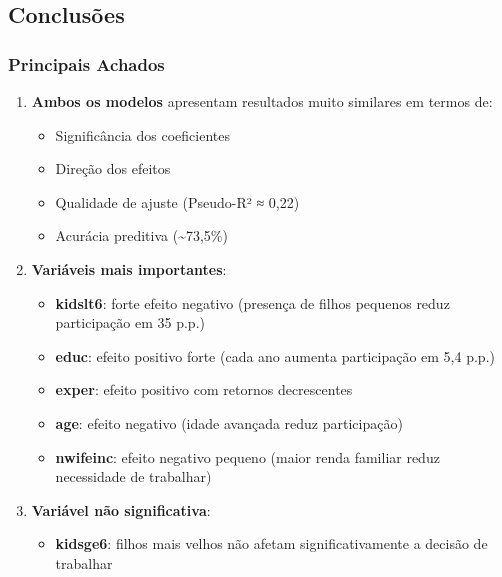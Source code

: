 \documentclass[
  letterpaper,
  DIV=11,
  numbers=noendperiod]{scrartcl}
\providecommand{\tightlist}{%
  \setlength{\itemsep}{0pt}\setlength{\parskip}{0pt}}\usepackage{longtable,booktabs,array}
\begin{document}
\subsection{Conclusões}\label{conclusuxf5es}

\subsubsection{Principais Achados}\label{principais-achados}

\begin{enumerate}
\def\labelenumi{\arabic{enumi}.}
\tightlist
\item
  \textbf{Ambos os modelos} apresentam resultados muito similares em
  termos de:

  \begin{itemize}
  \tightlist
  \item
    Significância dos coeficientes
  \item
    Direção dos efeitos
  \item
    Qualidade de ajuste (Pseudo-R² ≈ 0,22)
  \item
    Acurácia preditiva (\textasciitilde73,5\%)
  \end{itemize}
\item
  \textbf{Variáveis mais importantes}:

  \begin{itemize}
  \tightlist
  \item
    \textbf{kidslt6}: forte efeito negativo (presença de filhos pequenos
    reduz participação em 35 p.p.)
  \item
    \textbf{educ}: efeito positivo forte (cada ano aumenta participação
    em 5,4 p.p.)
  \item
    \textbf{exper}: efeito positivo com retornos decrescentes
  \item
    \textbf{age}: efeito negativo (idade avançada reduz participação)
  \item
    \textbf{nwifeinc}: efeito negativo pequeno (maior renda familiar
    reduz necessidade de trabalhar)
  \end{itemize}
\item
  \textbf{Variável não significativa}:

  \begin{itemize}
  \tightlist
  \item
    \textbf{kidsge6}: filhos mais velhos não afetam significativamente a
    decisão de trabalhar
  \end{itemize}
\end{enumerate}
\end{document}
